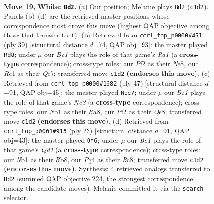 \documentclass[11pt]{article}
\begin{document}
\clearpage

\begin{figure}[p]\centering
\begin{subfigure}{0.46\textwidth}\centering
\resizebox{\linewidth}{!}{%
\newchessgame
\chessboard[
  setfen={r1b1r3/1pp2pkp/2nq4/p2p2b1/3P2P1/NP2P3/P4P2/RNBQRK2 w - - 1 19},
  showmover=false,
  pgfstyle=straightmove, color=movearrow, markmove={c1-d2}
]}
\caption{}
\end{subfigure}\hfill
\begin{subfigure}{0.46\textwidth}\centering
\resizebox{\linewidth}{!}{%
\newchessgame
\chessboard[
  setfen={r3nrk1/2q2p1p/p1bp2p1/1p6/4PQ2/P1NR1B2/1PP3PP/5R1K b - - 0 20},
  showmover=false,
  pgfstyle=straightmove, color=movearrow, markmove={a8-d8}
]}
\caption{}
\end{subfigure}
\\[4pt]
\begin{subfigure}{0.46\textwidth}\centering
\resizebox{\linewidth}{!}{%
\newchessgame
\chessboard[
  setfen={r3qrnk/pp4pb/2np1p2/4p3/4P1QN/2PBB2P/PP3P2/R3R1K1 b - - 1 24},
  showmover=false,
  pgfstyle=straightmove, color=movearrow, markmove={c6-e7}
]}
\caption{}
\end{subfigure}\hfill
\begin{subfigure}{0.46\textwidth}\centering
\resizebox{\linewidth}{!}{%
\newchessgame
\chessboard[
  setfen={1rbq1rk1/ppp2pp1/2np3p/8/4PP2/2Q2N2/PPP3PP/2KR1BR1 b - - 0 12},
  showmover=false,
  pgfstyle=straightmove, color=movearrow, markmove={d8-f6}
]}
\caption{}
\end{subfigure}
\caption{\textbf{Move 19, White: \texttt{Bd2}.} (a) Our position; Melanie plays \texttt{Bd2} (\texttt{c1d2}). Panels (b)--(d) are the retrieved master positions whose correspondence most drove this move (highest QAP objective among those that transfer to it). (b) Retrieved from \texttt{ccrl\_top\_p0000\#451} (ply 39) [structural distance $d$=74, QAP obj=93]: the master played \texttt{Rd8}; under $\mu$ our \emph{Bc1} plays the role of that game's \emph{Ra1} (a \textbf{cross-type} correspondence); cross-type roles: our \emph{P}f2 as their \emph{N}e8, our \emph{R}e1 as their \emph{Q}c7; transferred move \texttt{c1d2} \textbf{(endorses this move)}. (c) Retrieved from \texttt{ccrl\_top\_p0000\#1682} (ply 47) [structural distance $d$=91, QAP obj=45]: the master played \texttt{Nce7}; under $\mu$ our \emph{Bc1} plays the role of that game's \emph{Nc3} (a \textbf{cross-type} correspondence); cross-type roles: our \emph{N}b1 as their \emph{R}a8, our \emph{P}f2 as their \emph{Q}e8; transferred move \texttt{c1d2} \textbf{(endorses this move)}. (d) Retrieved from \texttt{ccrl\_top\_p0001\#913} (ply 23) [structural distance $d$=91, QAP obj=43]: the master played \texttt{Qf6}; under $\mu$ our \emph{Bc1} plays the role of that game's \emph{Qd1} (a \textbf{cross-type} correspondence); cross-type roles: our \emph{N}b1 as their \emph{R}b8, our \emph{P}g4 as their \emph{B}c8; transferred move \texttt{c1d2} \textbf{(endorses this move)}. Synthesis: 4 retrieved analogs transferred to \texttt{Bd2} (summed QAP objective 224, the strongest correspondence among the candidate moves); Melanie committed it via the \texttt{search} selector.}
\label{fig:thought-m36}
\end{figure}
\end{document}
